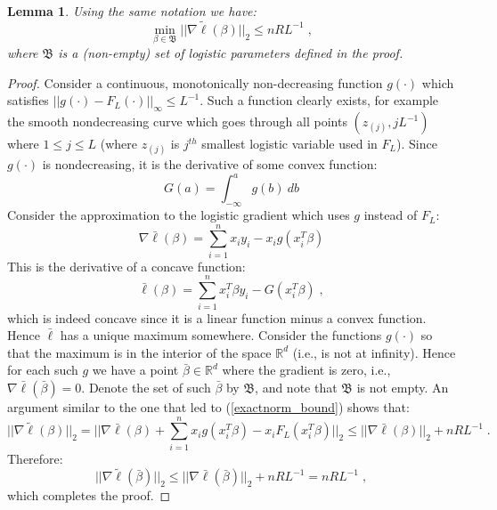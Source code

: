 \documentclass[11pt]{article}
\newtheorem{lem}[thm]{Lemma}
\begin{document}
\begin{lem}\label{lem_gradmin}
Using the same notation we have:
\begin{equation}\label{approxnorm_bound} 
\min_{\beta\in\mathfrak{B}} ||\nabla\tilde{\ell}(\beta)||_2 \leq nRL^{-1} \; ,
\end{equation}
where $\mathfrak{B}$ is a (non-empty) set of logistic parameters defined in the proof.
\end{lem}
\begin{proof}
Consider a continuous, monotonically non-decreasing function $g(\cdot)$ which satisfies $||g(\cdot)-F_L(\cdot)||_\infty \leq L^{-1}$.  Such a function clearly exists, for example the smooth nondecreasing curve which goes through all points $(z_{(j)},jL^{-1})$ where $1\leq j\leq L$ (where $z_{(j)}$ is $j^{th}$ smallest logistic variable used in $F_L$).  Since $g(\cdot)$ is nondecreasing, it is the derivative of some convex function:
\begin{equation}G(a) = \int_{-\infty}^a{\! g(b)\ db}\end{equation}
Consider the approximation to the logistic gradient which uses $g$ instead of $F_L$:
\begin{equation}\nabla\bar{\ell}(\beta) = \sum_{i=1}^n{x_iy_i-x_ig(x_i^T\beta)}\end{equation}
This is the derivative of a concave function:
\begin{equation}\bar{\ell}(\beta) = \sum_{i=1}^n{x_i^T\beta y_i-G(x_i^T\beta)} \; ,
\end{equation}
which is indeed concave since it is a linear function minus a convex function.  Hence $\bar{\ell}$ has a unique maximum somewhere. Consider the functions $g(\cdot)$ so that the maximum is in the interior of the space $\mathbb{R}^d$ (i.e., is not at infinity).  Hence for each such $g$ we have a point $\bar{\beta} \in \mathbb{R}^d$ where the gradient is zero, i.e., $\nabla\bar{\ell}(\bar{\beta}) = 0$. Denote the set of such $\bar{\beta}$ by $\mathfrak{B}$, and note that $\mathfrak{B}$ is not empty. 
An argument similar to the one that led to (\ref{exactnorm_bound}) shows that:
\begin{equation}
||\nabla\tilde{\ell}(\beta)||_2 = ||\nabla\bar{\ell}(\beta) + \sum_{i=1}^n{x_ig(x_i^T\beta)-x_iF_L(x_i^T\beta)}||_2 \leq ||\nabla\bar{\ell}(\beta)||_2 + nRL^{-1} \; .
\end{equation}
Therefore:
\begin{equation}||\nabla\tilde{\ell}(\bar{\beta})||_2 \leq ||\nabla\bar{\ell}(\bar{\beta})||_2 + nRL^{-1} = nRL^{-1} \; ,
\end{equation}
which completes the proof.
\end{proof}
\end{document}
